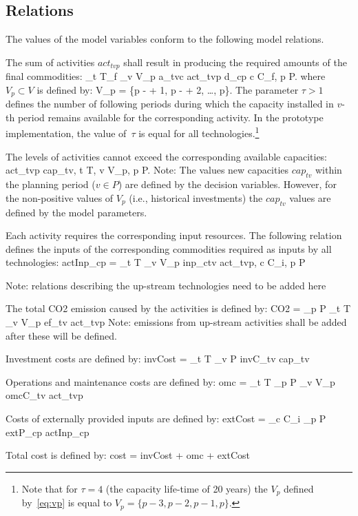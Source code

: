 \documentclass[a4paper,12pt]{article}
\begin{document}
\subsection{Relations}\label{sec:rel}
The values of the model variables conform to the following model relations.
\btlb
\item The sum of activities $act_{tvp}$ shall result in producing the required
	amounts of the final commodities:
	\be
	\sum_{t \in T_f} \sum_{v \in V_p} a_{tvc} \cdot act_{tvp} \ge d_{cp} \quad
		c \in C_f, p \in P.
	\ee
	where $V_p \subset V$ is defined by:
	\be \label{eq:vp}
		V_p = \{p - \tau + 1, p - \tau + 2, \dots, p\}.
	\ee
	The parameter $\tau > 1$ defines the number of following periods during which the
	capacity installed in $v$-th period remains available for the corresponding
	activity. In the prototype implementation, the value of~$\tau$ is equal
	for all technologies.\footnote{
	Note that for $\tau = 4$ (the capacity life-time of 20 years) the
	$V_p$ defined by~\eqref{eq:vp} is equal to
	$V_p = \{p - 3, p - 2, p - 1, p\}$.}
\item The levels of activities cannot exceed the corresponding available
	capacities:
	\be
		act_{tvp} \le cap_{tv}, \quad t \in T, v \in V_p, p \in P.
	\ee
	Note: The values new capacities $cap_{tv}$ within the planning period
	($v \in P$) are defined by the decision variables.
	However, for the non-positive values of $V_{p}$ (i.e., historical investments)
	the $cap_{tv}$ values are defined by the model parameters.
\item Each activity requires the corresponding input resources.
	The following relation defines the inputs of the corresponding commodities
	required as inputs by all technologies:
	\be
		actInp_{cp} = \sum_{t \in T} \sum_{v \in V_p} inp_{ctv} \cdot act_{tvp},
		\quad  c \in C_i,\; p \in P
	\ee
\item Note: relations describing the up-stream technologies need to be added here
\item The total CO2 emission caused by the activities is defined by:
	\be
		CO2 = \sum_{p \in P} \sum_{t \in T} \sum_{v \in V_p} ef_{tv} \cdot act_{tvp}
	\ee
	Note: emissions from up-stream activities shall be added after these will be defined.
\item Investment costs are defined by:
	\be
		invCost = \sum_{t \in T} \sum_{v \in P} invC_{tv} \cdot cap_{tv}
	\ee
\item Operations and maintenance costs are defined by:
	\be
		omc = \sum_{t \in T} \sum_{p \in P} \sum_{v \in V_p} omcC_{tv} \cdot act_{tvp}
	\ee
\item Costs of externally provided inputs are defined by:
	\be
		extCost = \sum_{c \in C_i} \sum_{p \in P} extP_{cp} \cdot actInp_{cp}
	\ee
\item Total cost is defined by:
	\be
		cost = invCost + omc + extCost
	\ee
\etl
\end{document}
